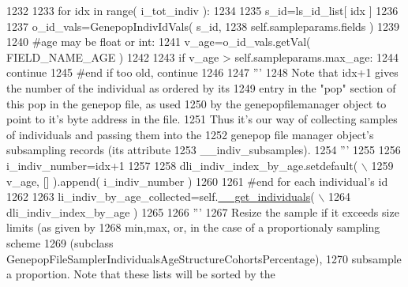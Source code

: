 \begin{DoxyCode}
1232                 
1233                 \textcolor{keywordflow}{for} idx \textcolor{keywordflow}{in} range( i\_tot\_indiv ):
1234 
1235                     s\_id=ls\_id\_list[ idx ]
1236 
1237                     o\_id\_vals=GenepopIndivIdVals( s\_id, 
1238                                         self.sampleparams.fields )
1239                     
1240                     \textcolor{comment}{#age may be float or int:}
1241                     v\_age=o\_id\_vals.getVal( FIELD\_NAME\_AGE )
1242 
1243                     \textcolor{keywordflow}{if} v\_age > self.sampleparams.max\_age:
1244                         \textcolor{keywordflow}{continue}
1245                     \textcolor{comment}{#end if too old, continue}
1246 
1247                     \textcolor{stringliteral}{'''}
1248 \textcolor{stringliteral}{                    Note that idx+1 gives the number of the individual as ordered by its}
1249 \textcolor{stringliteral}{                    entry in the "pop" section of this pop in the genepop file, as used}
1250 \textcolor{stringliteral}{                    by the genepopfilemanager object to point to it's byte address in the file.}
1251 \textcolor{stringliteral}{                    Thus it's our way of collecting samples of individuals and passing them into the}
1252 \textcolor{stringliteral}{                    genepop file manager object's subsampling records (its attribute }
1253 \textcolor{stringliteral}{                    \_\_indiv\_subsamples).}
1254 \textcolor{stringliteral}{                    '''}
1255 
1256                     i\_indiv\_number=idx+1
1257 
1258                     dli\_indiv\_index\_by\_age.setdefault( \(\backslash\)
1259                                 v\_age, [] ).append( i\_indiv\_number ) 
1260 
1261                 \textcolor{comment}{#end for each individual's id   }
1262 
1263                 li\_indiv\_by\_age\_collected=self.\hyperlink{classnegui_1_1genepopfilesampler_1_1GenepopFileSamplerIndividualsAgeStructureCohorts_a7c5c9e3e3aeb9c9c25c95029781e63d1}{\_\_get\_individuals}( \(\backslash\)
1264                                                 dli\_indiv\_index\_by\_age ) 
1265             
1266                 \textcolor{stringliteral}{'''}
1267 \textcolor{stringliteral}{                Resize the sample if it exceeds size limits (as given by}
1268 \textcolor{stringliteral}{                min,max, or, in the case of a proportionaly sampling scheme}
1269 \textcolor{stringliteral}{                (subclass GenepopFileSamplerIndividualsAgeStructureCohortsPercentage),}
1270 \textcolor{stringliteral}{                subsample a proportion.  Note that these lists will be sorted by the}

\end{DoxyCode}
